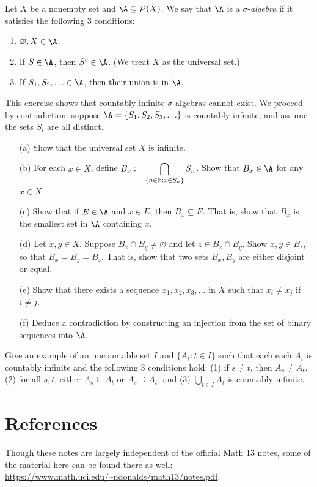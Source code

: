 \documentclass{article}
\begin{document}
\begin{exercise}
Let $X$ be a nonempty set and $\A\subseteq \mathcal P(X)$. We say that $\A$ is a $\sigma$-\textit{algebra} if it satisfies the following 3 conditions:
\begin{enumerate}
    \item $\varnothing, X\in\A$.
    \item If $S\in \A$, then $S^c\in \A$. (We treat $X$ as the universal set.)
    \item If $S_1, S_2,\ldots\in \A$, then their union is in $\A$.
\end{enumerate}
This exercise shows that countably infinite $\sigma$-algebras cannot exist. We proceed by contradiction: suppose $\A = \{S_1, S_2,S_3,\ldots\}$ is countably infinite, and assume the sets $S_i$ are all distinct.
\begin{itemize}
    \item[(a)] Show that the universal set $X$ is infinite.
    \item[(b)] For each $x\in X$, define $B_x := \displaystyle \bigcap_{\{n\in\mathbb N: x\in S_n\}} S_n$. Show that $B_x\in\A$ for any $x\in X$.
    \item[(c)] Show that if $E\in\A$ and $x\in E$, then $B_x\subseteq E$. That is, show that $B_x$ is the smallest set in $\A$ containing $x$.
    \item[(d)] Let $x,y\in X$. Suppose $B_x\cap B_y \neq \varnothing$ and let $z\in B_x\cap B_y$. Show $x,y\in B_z$, so that $B_x = B_y = B_z$. That is, show that two sets $B_x, B_y$ are either disjoint or equal.
    \item[(e)] Show that there exists a sequence $x_1, x_2, x_3, \ldots$ in $X$ such that $x_i\neq x_j$ if $i\neq j$.
    \item[(f)] Deduce a contradiction by constructing an injection from the set of binary sequences into $\A$.
\end{itemize}
\end{exercise}
\begin{exercise}
Give an example of an uncountable set $I$ and $\{A_t: t\in I\}$ such that each each $A_t$ is countably infinite and the following $3$ conditions hold: (1) if $s\neq t$, then $A_s\neq A_t$, (2) for all $s,t$, either $A_s\subseteq A_t$ or $A_s\supseteq A_t$, and (3) $\bigcup_{t\in I} A_t$ is countably infinite.
\end{exercise}

\section*{References}
Though these notes are largely independent of the official Math 13 notes, some of the material here can be found there as well: \url{https://www.math.uci.edu/~ndonalds/math13/notes.pdf}.
\end{document}

